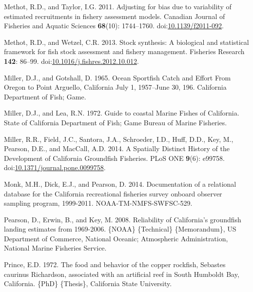\documentclass[11pt,
  english,
  letterpaper,
]{article}
\newlength{\cslhangindent}
\newenvironment{CSLReferences}[2] %
 {%
  \setlength{\parindent}{0pt}
  \ifodd #1 \everypar{\setlength{\hangindent}{\cslhangindent}}\ignorespaces\fi
  \ifnum #2 > 0
  \setlength{\parskip}{#2\baselineskip}
  \fi
 }%
 {}
\begin{document}
\begin{CSLReferences}{1}{0}
\leavevmode{}%
Methot, R.D., and Taylor, I.G. 2011. Adjusting for bias due to variability of estimated recruitments in fishery assessment models. Canadian Journal of Fisheries and Aquatic Sciences \textbf{68}(10): 1744--1760. doi:\href{https://doi.org/10.1139/f2011-092}{10.1139/f2011-092}.

\leavevmode{}%
Methot, R.D., and Wetzel, C.R. 2013. Stock synthesis: A biological and statistical framework for fish stock assessment and fishery management. Fisheries Research \textbf{142}: 86--99. doi:\href{https://doi.org/10.1016/j.fishres.2012.10.012}{10.1016/j.fishres.2012.10.012}.

\leavevmode{}%
Miller, D.J., and Gotshall, D. 1965. Ocean {Sportfish} {Catch} and {Effort} {From} {Oregon} to {Point} {Arguello}, {California} {July} 1, 1957--{June} 30, 196. California Department of Fish; Game.

\leavevmode{}%
Miller, D.J., and Lea, R.N. 1972. Guide to coastal {Marine} {Fishes} of {California}. State of California Department of Fish; Game Bureau of Marine Fisheries.

\leavevmode{}%
Miller, R.R., Field, J.C., Santora, J.A., Schroeder, I.D., Huff, D.D., Key, M., Pearson, D.E., and MacCall, A.D. 2014. A {Spatially} {Distinct} {History} of the {Development} of {California} {Groundfish} {Fisheries}. PLoS ONE \textbf{9}(6): e99758. doi:\href{https://doi.org/10.1371/journal.pone.0099758}{10.1371/journal.pone.0099758}.

\leavevmode{}%
Monk, M.H., Dick, E.J., and Pearson, D. 2014. Documentation of a relational database for the {California} recreational fisheries survey onboard observer sampling program, 1999-2011. NOAA-TM-NMFS-SWFSC-529.

\leavevmode{}%
Pearson, D., Erwin, B., and Key, M. 2008. Reliability of {California}'s groundfish landing estimates from 1969-2006. \{NOAA\} \{Technical\} \{Memorandum\}, US Department of Commerce, National Oceanic; Atmospheric Administration, National Marine Fisheries Service.

\leavevmode{}%
Prince, E.D. 1972. The food and behavior of the copper rockfish, {Sebastes} caurinus {Richardson}, associated with an artificial reef in {South} {Humboldt} {Bay}, {California}. \{PhD\} \{Thesis\}, California State University.


\end{CSLReferences}
\end{document}
